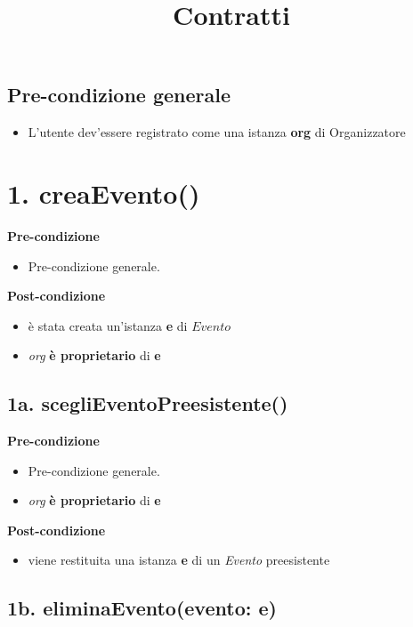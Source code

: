 \documentclass[12pt]{extarticle}
\begin{document}
\title{Contratti}
\date{}
\maketitle

\subsection*{Pre-condizione generale}

\begin{itemize}
  \item L'utente dev'essere registrato come una istanza \textbf{org} di Organizzatore
\end{itemize}

\section*{1. creaEvento()}

\textbf{Pre-condizione}
\begin{itemize}
  \item Pre-condizione generale.
\end{itemize}
\textbf{Post-condizione}
\begin{itemize}
  \item è stata creata un'istanza \textbf{e} di $Evento$
  \item \textit{org} \textbf{è proprietario} di \textbf{e}
\end{itemize}

\subsection*{1a. scegliEventoPreesistente()}
\textbf{Pre-condizione}
\begin{itemize}
  \item Pre-condizione generale.
  \item \textit{org} \textbf{è proprietario} di \textbf{e}
\end{itemize}
\textbf{Post-condizione}
\begin{itemize}
  \item viene restituita una istanza \textbf{e} di un \textit{Evento} preesistente
\end{itemize}

\subsection*{1b. eliminaEvento(evento: e)}
\end{document}

